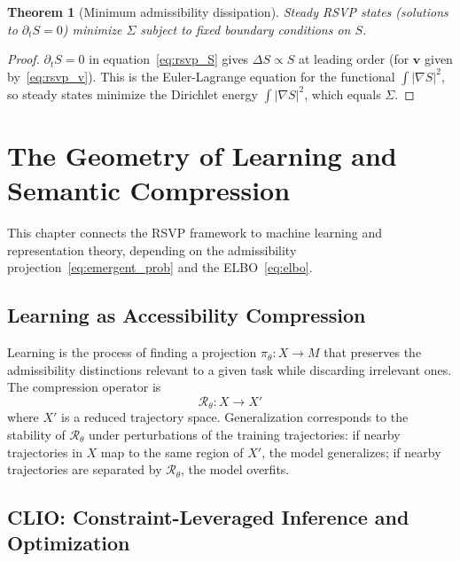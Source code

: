 \documentclass[11pt, openright, twoside]{book}
\theoremstyle{plain}
\newtheorem{theorem}{Theorem}[chapter]
\theoremstyle{definition}
\theoremstyle{remark}
\newcommand{\vfield}{\mathbf{v}}
\newcommand{\Sfield}{S}
\newcommand{\Traj}{X}
\newcommand{\Rep}{M}
\newcommand{\proj}{\pi}
\begin{document}
\begin{theorem}[Minimum admissibility dissipation]
Steady RSVP states (solutions to $\partial_t\Sfield=0$) minimize $\Sigma$ subject to
fixed boundary conditions on $\Sfield$.
\end{theorem}

\begin{proof}
$\partial_t\Sfield=0$ in equation~\eqref{eq:rsvp_S} gives $\Delta\Sfield\propto\Sfield$ at
leading order (for $\vfield$ given by~\eqref{eq:rsvp_v}). This is the Euler-Lagrange
equation for the functional $\int|\nabla\Sfield|^2$, so steady states minimize the
Dirichlet energy $\int|\nabla\Sfield|^2$, which equals $\Sigma$.
\end{proof}

\chapter{The Geometry of Learning and Semantic Compression}

\begin{depbox}
This chapter connects the RSVP framework to machine learning and representation theory,
depending on the admissibility projection~\eqref{eq:emergent_prob} and the ELBO~\eqref{eq:elbo}.
\end{depbox}

\section{Learning as Accessibility Compression}

Learning is the process of finding a projection $\proj_\theta:\Traj\to\Rep$ that preserves
the admissibility distinctions relevant to a given task while discarding irrelevant ones.
The compression operator is
\begin{equation}
  \mathcal{R}_\theta:\Traj\to\Traj'
\end{equation}
where $\Traj'$ is a reduced trajectory space. Generalization corresponds to the stability
of $\mathcal{R}_\theta$ under perturbations of the training trajectories: if nearby
trajectories in $\Traj$ map to the same region of $\Traj'$, the model generalizes; if
nearby trajectories are separated by $\mathcal{R}_\theta$, the model overfits.

\section{CLIO: Constraint-Leveraged Inference and Optimization}
\end{document}
